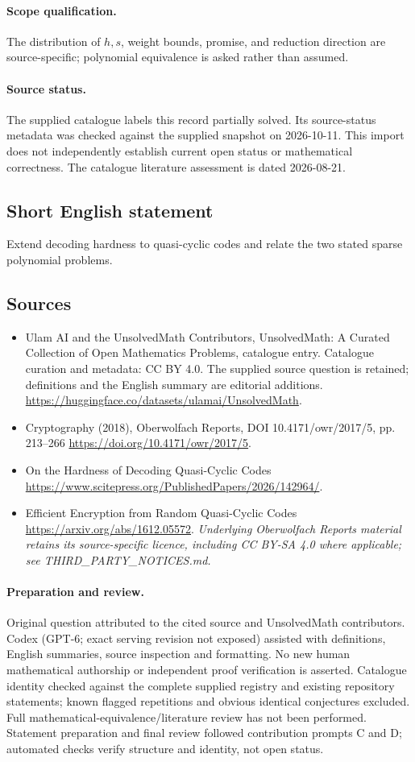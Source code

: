 \documentclass[11pt]{article}
\begin{document}
\paragraph{Scope qualification.}
The distribution of $h,s$, weight bounds, promise, and reduction direction are source-specific; polynomial equivalence is asked rather than assumed.
\paragraph{Source status.}
The supplied catalogue labels this record partially solved. Its source-status metadata was checked against the supplied snapshot on 2026-10-11. This import does not independently establish current open status or mathematical correctness. The catalogue literature assessment is dated 2026-08-21.
\subsection{Short English statement}
Extend decoding hardness to quasi-cyclic codes and relate the two stated sparse polynomial problems.
\subsection{Sources}
\begin{itemize}
\item[S1] Ulam AI and the UnsolvedMath Contributors, UnsolvedMath: A Curated Collection of Open Mathematics Problems, catalogue entry. Catalogue curation and metadata: CC BY 4.0. The supplied source question is retained; definitions and the English summary are editorial additions.
\url{https://huggingface.co/datasets/ulamai/UnsolvedMath}.
\item[S2] Cryptography (2018), Oberwolfach Reports, DOI 10.4171/owr/2017/5, pp. 213--266
\url{https://doi.org/10.4171/owr/2017/5}.
\item[S3] On the Hardness of Decoding Quasi-Cyclic Codes
\url{https://www.scitepress.org/PublishedPapers/2026/142964/}.
\item[S4] Efficient Encryption from Random Quasi-Cyclic Codes
\url{https://arxiv.org/abs/1612.05572}.
\textit{Underlying Oberwolfach Reports material retains its source-specific licence, including CC BY-SA 4.0 where applicable; see THIRD\_PARTY\_NOTICES.md.}
\end{itemize}
\paragraph{Preparation and review.}
Original question attributed to the cited source and UnsolvedMath contributors. Codex (GPT-6; exact serving revision not exposed) assisted with definitions, English summaries, source inspection and formatting. No new human mathematical authorship or independent proof verification is asserted. Catalogue identity checked against the complete supplied registry and existing repository statements; known flagged repetitions and obvious identical conjectures excluded. Full mathematical-equivalence/literature review has not been performed. Statement preparation and final review followed contribution prompts C and D; automated checks verify structure and identity, not open status.
\label{end:statement}
\end{document}
